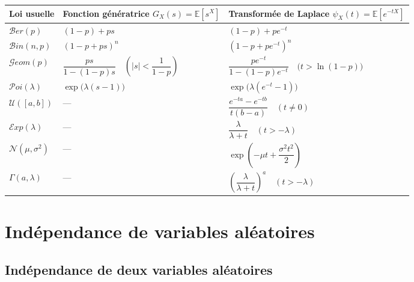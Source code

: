 \documentclass{article}
\begin{document}
\begin{center}
\renewcommand{\arraystretch}{1.9}
\setlength{\tabcolsep}{6pt}
\small
\begin{tabularx}{\linewidth}{|l|X|X|}
\hline
\textbf{Loi usuelle} & \textbf{Fonction génératrice} $G_X(s) = \mathbb{E}[s^X]$ & \textbf{Transformée de Laplace} $\psi_X(t) = \mathbb{E}[e^{-tX}]$ \\
\hline
$\mathcal{B}er(p)$ & $(1 - p) + ps$ & $(1 - p) + pe^{-t}$ \\
\hline
$\mathcal{B}in(n,p)$ & $(1 - p + ps)^n$ & $(1 - p + pe^{-t})^n$ \\
\hline
$\mathcal{G}eom(p)$ & $\dfrac{ps}{1 - (1-p)s} \quad \left(|s| < \dfrac{1}{1-p}\right)$ & $\dfrac{pe^{-t}}{1 - (1-p)e^{-t}} \quad \big(t > \ln(1-p)\big)$ \\
\hline
$\mathcal{P}oi(\lambda)$ & $\exp\big(\lambda(s - 1)\big)$ & $\exp\big(\lambda(e^{-t} - 1)\big)$ \\
\hline
$\mathcal{U}([a,b])$ & --- & $\dfrac{e^{-ta} - e^{-tb}}{t(b-a)} \quad (t \neq 0)$ \\
\hline
$\mathcal{E}xp(\lambda)$ & --- & $\dfrac{\lambda}{\lambda + t} \quad (t > -\lambda)$ \\
\hline
$\mathcal{N}(\mu, \sigma^2)$ & --- & $\exp\left(-\mu t + \dfrac{\sigma^2 t^2}{2}\right)$ \\
\hline
$\Gamma(a, \lambda)$ & --- & $\left(\dfrac{\lambda}{\lambda + t}\right)^a \quad (t > -\lambda)$ \\
\hline
\end{tabularx}
\end{center}

\section{Indépendance de variables aléatoires}

\subsection{Indépendance de deux variables aléatoires}

\end{document}
